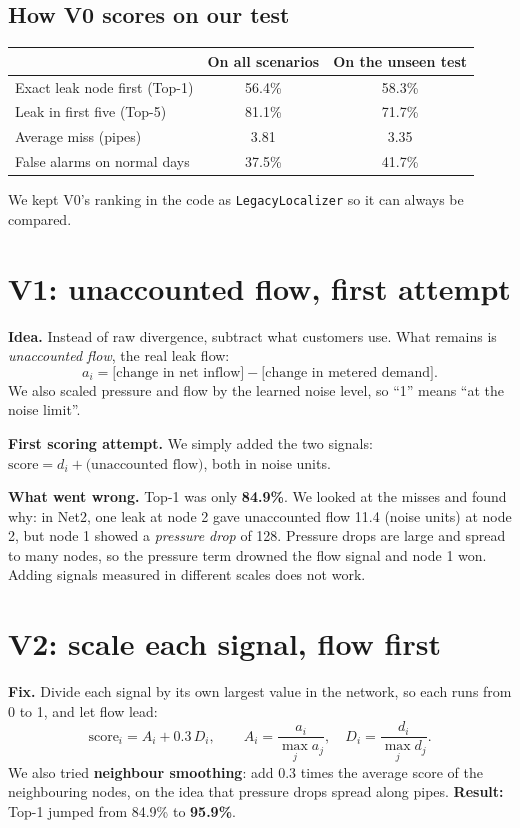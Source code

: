 \documentclass[11pt,a4paper]{article}
\newcommand{\code}[1]{\texttt{#1}}
\begin{document}
\subsection{How V0 scores on our test}
\begin{center}\small\begin{tabular}{@{}lcc@{}}\toprule
 & On all scenarios & On the unseen test \\\midrule
Exact leak node first (Top-1) & 56.4\% & 58.3\% \\
Leak in first five (Top-5) & 81.1\% & 71.7\% \\
Average miss (pipes) & 3.81 & 3.35 \\
False alarms on normal days & 37.5\% & 41.7\% \\\bottomrule\end{tabular}\end{center}
We kept V0's ranking in the code as \code{LegacyLocalizer} so it can always be compared.

\section{V1: unaccounted flow, first attempt}
\textbf{Idea.} Instead of raw divergence, subtract what customers use. What remains is \emph{unaccounted flow}, the real leak flow:
\[a_i=\big[\text{change in net inflow}\big]-\big[\text{change in metered demand}\big].\]
We also scaled pressure and flow by the learned noise level, so ``1'' means ``at the noise limit''.

\textbf{First scoring attempt.} We simply added the two signals: $\text{score}=d_i+\text{(unaccounted flow)}$, both in noise units.

\textbf{What went wrong.} Top-1 was only \textbf{84.9\%}. We looked at the misses and found why: in Net2, one leak at node 2 gave unaccounted flow 11.4 (noise units) at node 2, but node 1 showed a \emph{pressure drop} of 128. Pressure drops are large and spread to many nodes, so the pressure term drowned the flow signal and node 1 won. Adding signals measured in different scales does not work.

\section{V2: scale each signal, flow first}
\textbf{Fix.} Divide each signal by its own largest value in the network, so each runs from 0 to 1, and let flow lead:
\[\text{score}_i=A_i+0.3\,D_i,\qquad A_i=\frac{a_i}{\max_j a_j},\quad D_i=\frac{d_i}{\max_j d_j}.\]
We also tried \textbf{neighbour smoothing}: add 0.3 times the average score of the neighbouring nodes, on the idea that pressure drops spread along pipes.
\textbf{Result:} Top-1 jumped from 84.9\% to \textbf{95.9\%}.
\end{document}
